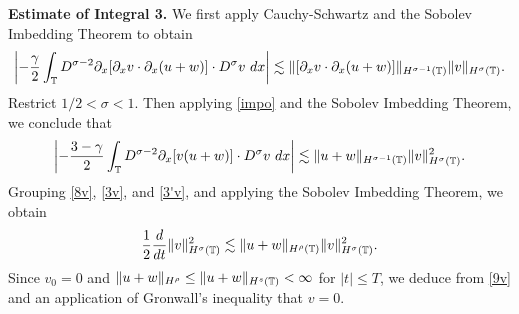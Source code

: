 \textbf{Estimate of Integral 3.} We first apply
Cauchy-Schwartz and the Sobolev Imbedding Theorem to obtain
%
%
\begin{equation*}
\begin{split}
\left | - \frac{\gamma}{2} \int_{\mathbb{T}} D^{\sigma 
-2} \partial_x [ \partial_x v
\cdot \partial_x (u+w)]\cdot D^\sigma v \ dx \right | 
 \lesssim 
\|[\partial_x v \cdot \partial_x (u+w)] \|_{H^{\sigma -1}(\mathbb{T})}
\|v\|_{H^\sigma(\mathbb{T})}.
\end{split}
\end{equation*}
%
%
Restrict $1/2 < \sigma < 1$. Then applying \cref{impo} and the Sobolev 
Imbedding Theorem, we conclude that
%
%
\begin{equation}
\begin{split}
\left | - \frac{3-\gamma}{2} \int_{\mathbb{T}}  D^{\sigma -2}
\partial_x[v(u+w)] \cdot
D^\sigma v \ dx  \right |
 \lesssim \|u+w \|_{H^{\sigma - 1}(\mathbb{T})}
\|v\|_{H^\sigma(\mathbb{T})}^2.
\label{3'v}
\end{split}
\end{equation}
%
%
%
%
Grouping \eqref{8v}, \eqref{3v}, and \eqref{3'v}, and 
applying
the Sobolev Imbedding Theorem, we obtain
%
%
\begin{equation}
\begin{split}
\frac{1}{2} \frac{d}{dt}
\|v\|_{H^\sigma(\mathbb{T})}^2 \lesssim \|u+w\|_{H^\rho(\mathbb{T})}
\|v\|_{H^\sigma(\mathbb{T})}^2.
\label{9v}
\end{split}
\end{equation}
%
%
%
%
%
%
Since $v_0 = 0$ and $\|u + w \|_{H^\rho}
\le \|u + w \|_{H^s(\mathbb{T})} < \infty$ for $|t| \le T$, we deduce from 
\eqref{9v} and an application of  Gronwall's 
inequality that $v = 0$. \qquad \qedsymbol
%
%
%

